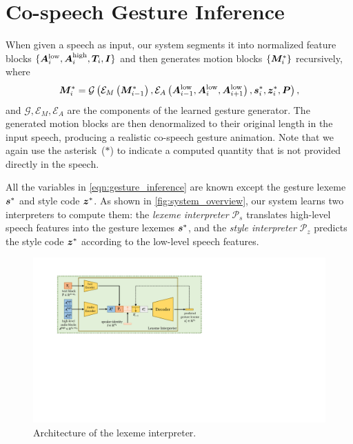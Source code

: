\section{Co-speech Gesture Inference}
\label{sec:co-speech_gesture_inference}
When given a speech as input, our system segments it into normalized feature blocks $\{\bm{A}_i^{{\text{low}}}, \bm{A}_i^{{\text{high}}}, \bm{T}_i, \bm{I}\}$ and then generates motion blocks $\{\bm{M}_i^*\}$ recursively, where 
\begin{align}
    \bm{M}_i^* = \mathcal{G}\left(
        \mathcal{E}_M\left(\bm{M}_{i-1}^*\right), 
        \mathcal{E}_A\left(\bm{A}^{{\text{low}}}_{i-1}, \bm{A}^{{\text{low}}}_{i}, \bm{A}^{{\text{low}}}_{i+1}\right), 
        \bm{s}_i^*, \bm{z}_i^*, \bm{P}
        \right),
    \label{eqn:gesture_inference}
\end{align}
and $\mathcal{G}, \mathcal{E}_M, \mathcal{E}_A$ are the components of the learned gesture generator. The generated motion blocks are then denormalized to their original length in the input speech, producing a realistic co-speech gesture animation. Note that we again use the asterisk~($*$) to indicate a computed quantity that is not provided directly in the speech. 

All the variables in \eqn\eqref{eqn:gesture_inference} are known except the gesture lexeme $\bm{s}^*$ and style code $\bm{z}^*$. As shown in \fig\ref{fig:system_overview}, our system learns two interpreters to compute them: the \emph{lexeme interpreter} $\mathcal{P}_s$ translates high-level speech features into the gesture lexemes $\bm{s}^*$, and the \emph{style interpreter} $\mathcal{P}_z$ predicts the style code $\bm{z}^*$ according to the low-level speech features. 

\begin{figure}[t]
    \centering
    \includegraphics[width=\linewidth]{figures/fig5.pdf}
    \caption{Architecture of the lexeme interpreter.}
    \Description{}
    \label{fig:interpreters}
\end{figure}

